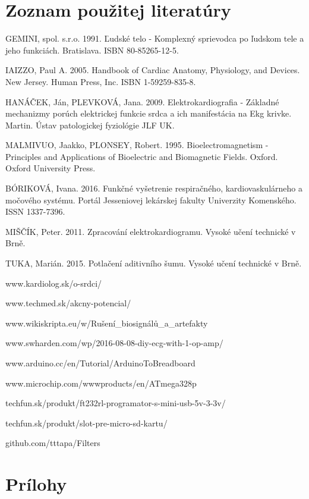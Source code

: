 \documentclass[titlepage,12pt]{article}
\begin{document}
\section{Zoznam použitej literatúry}
\begin{enumerate}[label={[\arabic*]}]
\item GEMINI, spol. s.r.o. 1991. Ľudské telo - Komplexný sprievodca po ľudskom tele a jeho funkciách. Bratislava. ISBN 80-85265-12-5.
\item IAIZZO, Paul A. 2005. Handbook of Cardiac Anatomy, Physiology, and Devices. New Jersey. Human Press, Inc. ISBN 1-59259-835-8.
\item HANÁČEK, Ján, PLEVKOVÁ, Jana. 2009. Elektrokardiografia - Základné mechanizmy porúch elektrickej funkcie srdca a ich manifestácia na Ekg krivke. Martin. Ústav patologickej fyziológie JLF UK.
\item MALMIVUO, Jaakko, PLONSEY, Robert. 1995. Bioelectromagnetism - Principles and Applications of Bioelectric and Biomagnetic Fields. Oxford. Oxford University Press.
\item BÓRIKOVÁ, Ivana. 2016. Funkčné vyšetrenie respiračného, kardiovaskulárneho a močového systému. Portál Jesseniovej lekárskej fakulty Univerzity Komenského. ISSN 1337-7396.
\item MIŠČÍK, Peter. 2011. Zpracování elektrokardiogramu. Vysoké učení technické v Brně. 
\item TUKA, Marián. 2015. Potlačení aditivního šumu. Vysoké učení technické v Brně. 
\item www.kardiolog.sk/o-srdci/
\item www.techmed.sk/akcny-potencial/
\item www.wikiskripta.eu/w/Rušení\_biosignálů\_a\_artefakty
\item www.swharden.com/wp/2016-08-08-diy-ecg-with-1-op-amp/
\item www.arduino.cc/en/Tutorial/ArduinoToBreadboard
\item www.microchip.com/wwwproducts/en/ATmega328p
\item techfun.sk/produkt/ft232rl-programator-s-mini-usb-5v-3-3v/
\item techfun.sk/produkt/slot-pre-micro-sd-kartu/
\item github.com/tttapa/Filters
\end{enumerate}

\newpage
\section{Prílohy}
\end{document}
